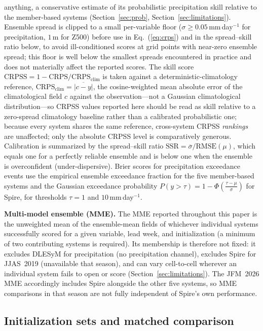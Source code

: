 \documentclass[11pt,a4paper]{article}
\begin{document}
anything, a conservative estimate of its probabilistic precipitation skill
relative to the member-based systems (Section~\ref{sec:prob},
Section~\ref{sec:limitations}). Ensemble spread is clipped
to a small per-variable floor ($\sigma\geq0.05$\,mm\,day$^{-1}$ for
precipitation, $1$\,m for Z500) before use in
Eq.~(\ref{eq:crps}) and in the spread--skill ratio below, to avoid
ill-conditioned scores at grid points with near-zero ensemble spread; this
floor is well below the smallest spreads encountered in practice and does not
materially affect the reported scores. The skill score
$\mathrm{CRPSS}=1-\mathrm{CRPS}/\mathrm{CRPS}_{\mathrm{clim}}$ is taken
against a deterministic-climatology reference, $\mathrm{CRPS}_{\mathrm{clim}}
= \overline{|c - y|}$, the cosine-weighted mean absolute error of the
climatological field $c$ against the observation---not a Gaussian
climatological distribution---so CRPSS values reported here should be read
as skill relative to a zero-spread climatology baseline rather than a
calibrated probabilistic one; because every system shares the same
reference, cross-system CRPSS \emph{rankings} are unaffected; only the
absolute CRPSS level is comparatively generous. Calibration is summarized by
the spread--skill ratio $\mathrm{SSR}=\overline{\sigma}/\mathrm{RMSE}(\mu)$,
which equals one for a perfectly reliable ensemble and is below one when the
ensemble is overconfident (under-dispersive). Brier scores for precipitation
exceedance events use the empirical ensemble exceedance fraction for the
five member-based systems and the Gaussian exceedance probability
$P(y>\tau)=1-\Phi\!\left(\tfrac{\tau-\mu}{\sigma}\right)$ for Spire, for
thresholds $\tau=1$ and $10$\,mm\,day$^{-1}$.

\textbf{Multi-model ensemble (MME).} The MME reported throughout this paper
is the unweighted mean of the ensemble-mean fields of whichever individual
systems successfully scored for a given variable, lead week, and
initialization (a minimum of two contributing systems is required). Its
membership is therefore not fixed: it excludes DLESyM for precipitation
(no precipitation channel), excludes Spire for JJAS~2019 (unavailable that
season), and can vary cell-to-cell wherever an individual system fails to
open or score (Section~\ref{sec:limitations}). The JFM~2026 MME accordingly
includes Spire alongside the other five systems, so MME comparisons in that
season are not fully independent of Spire's own performance.

\subsection{Initialization sets and matched comparison}\label{sec:inits}
\end{document}
